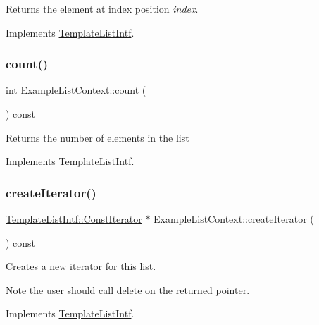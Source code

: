 Returns the element at index position {\itshape index}. 

Implements \mbox{\hyperlink{class_template_list_intf_aa51e57e72eacf4e8ce1055ee30a0f7f8}{Template\+List\+Intf}}.

\mbox{\label{class_example_list_context_a5670e7d7749f6a70c5c13b42ba9131ef}} 
\subsubsection{\texorpdfstring{count()}{count()}}
{\footnotesize\ttfamily int Example\+List\+Context\+::count (\begin{DoxyParamCaption}{ }\end{DoxyParamCaption}) const\hspace{0.3cm}{\ttfamily [virtual]}}

Returns the number of elements in the list 

Implements \mbox{\hyperlink{class_template_list_intf_a329e49e33484c2aa5106aac1bf4e5216}{Template\+List\+Intf}}.

\mbox{\label{class_example_list_context_a21d501486ce90f29c49aeaf48fa53676}} 
\subsubsection{\texorpdfstring{createIterator()}{createIterator()}}
{\footnotesize\ttfamily \mbox{\hyperlink{class_template_list_intf_1_1_const_iterator}{Template\+List\+Intf\+::\+Const\+Iterator}} $\ast$ Example\+List\+Context\+::create\+Iterator (\begin{DoxyParamCaption}{ }\end{DoxyParamCaption}) const\hspace{0.3cm}{\ttfamily [virtual]}}

Creates a new iterator for this list. \begin{DoxyNote}{Note}
the user should call delete on the returned pointer. 
\end{DoxyNote}


Implements \mbox{\hyperlink{class_template_list_intf_a56b82384db24c3e121076a1da046d378}{Template\+List\+Intf}}.

